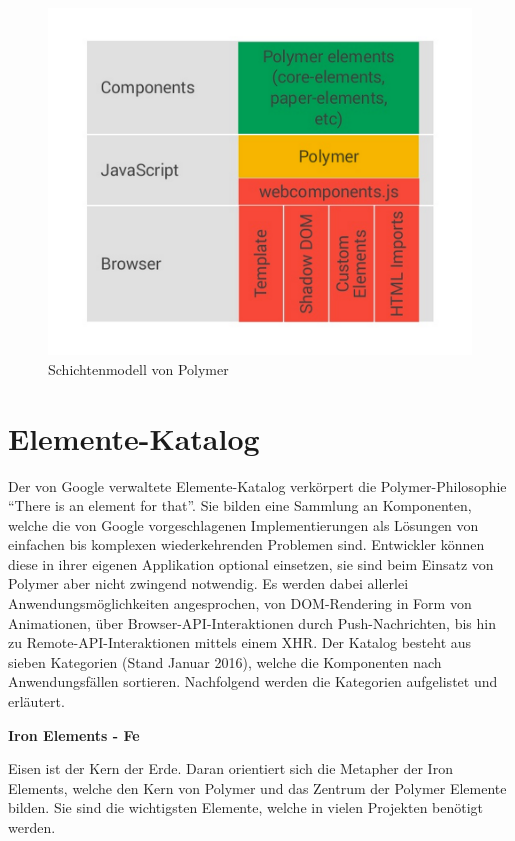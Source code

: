 \begin{figure}[htbp]
 \centering
 \includegraphics{kapitel3/bilder/1-architektur}
 \caption{Schichtenmodell von Polymer}
 \label{fig:schimopo}
\end{figure}


\section{Elemente-Katalog}\label{elemente-katalog}

Der von Google verwaltete Elemente-Katalog verkörpert die Polymer-Philosophie ``There is an element for that''. Sie bilden eine Sammlung an Komponenten, welche die von Google vorgeschlagenen Implementierungen als Lösungen von einfachen bis komplexen wiederkehrenden Problemen sind. Entwickler können diese in ihrer eigenen Applikation optional einsetzen, sie sind beim Einsatz von Polymer aber nicht zwingend notwendig. Es werden dabei allerlei Anwendungsmöglichkeiten angesprochen, von DOM-Rendering in Form von Animationen, über Browser-API-Interaktionen durch Push-Nachrichten, bis hin zu Remote-API-Interaktionen mittels einem XHR. Der Katalog besteht aus sieben Kategorien (Stand Januar 2016), welche die Komponenten nach Anwendungsfällen sortieren. Nachfolgend werden die Kategorien aufgelistet und erläutert.


\textbf{Iron Elements - Fe}

Eisen ist der Kern der Erde. Daran orientiert sich die Metapher der Iron Elements, welche den Kern von Polymer und das Zentrum der Polymer Elemente bilden. Sie sind die wichtigsten Elemente, welche in vielen Projekten benötigt werden.

